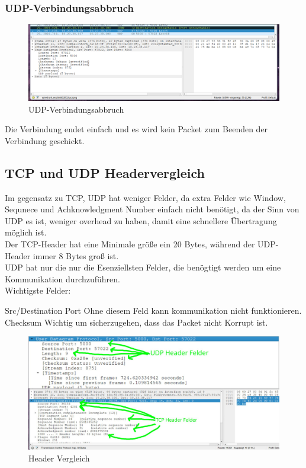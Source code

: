 \documentclass[a4paper]{article}
\begin{document}
\subsubsection{UDP-Verbindungsabbruch}
\begin{figure}[h]
	\includegraphics[scale=0.3]{images/udpverbindungsaufbau.png}
	\caption{UDP-Verbindungsabbruch}
\end{figure}

Die Verbindung endet einfach und es wird kein Packet zum Beenden der Verbindung geschickt.

\newpage
\subsection{TCP und UDP Headervergleich}

Im gegensatz zu TCP, UDP hat weniger Felder, da extra Felder wie Window, Sequnece und Achknowledgment Number einfach nicht benötigt, da der Sinn von UDP es ist, weniger overhead zu haben, damit eine schnellere Übertragung möglich ist.
\\
Der TCP-Header hat eine Minimale größe ein 20 Bytes, während der UDP-Header immer 8 Bytes groß ist. \cite{TCP-Header}\cite{UDP2}
\\
UDP hat nur die nur die Esenziellsten Felder, die benögtigt werden um eine Kommunikation durchzuführen.
\\
Wichtigste Felder:
\begin{outline}
	\1 Src/Destination Port
	\2 Ohne diesem Feld kann kommunikation nicht funktionieren.
	\1 Checksum
	\2 Wichtig um sicherzugehen, dass das Packet nicht Korrupt ist.
\end{outline}
\begin{figure}[h]
	\includegraphics[scale=0.9]{images/vergleich.jpg}
	\caption{Header Vergleich}
\end{figure}
\end{document}
